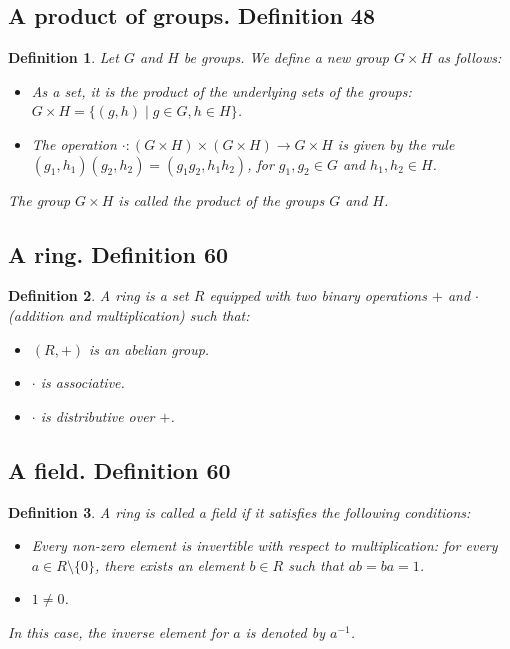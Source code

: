 \documentclass{article}
\newtheorem*{customdefinition}{Definition}
\begin{document}
\subsection*{A product of groups. Definition 48}
\begin{customdefinition}
Let \( G \) and \( H \) be groups. We define a new group \( G \times H \) as follows:
\begin{itemize}
    \item As a set, it is the product of the underlying sets of the groups: \( G \times H = \{ (g, h) \mid g \in G, h \in H \} \).
    \item The operation \( \cdot : (G \times H) \times (G \times H) \rightarrow G \times H \) is given by the rule \((g_1, h_1)(g_2, h_2) = (g_1 g_2, h_1 h_2)\), for \( g_1, g_2 \in G \) and \( h_1, h_2 \in H \).
\end{itemize}
The group \( G \times H \) is called the product of the groups \( G \) and \( H \).
\end{customdefinition}

\subsection*{A ring. Definition 60}
\begin{customdefinition}
A ring is a set \( R \) equipped with two binary operations \( + \) and \( \cdot \) (addition and multiplication) such that:
\begin{itemize}
    \item \( (R, +) \) is an abelian group.
    \item \( \cdot \) is associative.
    \item \( \cdot \) is distributive over \( + \).
\end{itemize}
\end{customdefinition}

\subsection*{A field. Definition 60}
\begin{customdefinition}
A ring is called a field if it satisfies the following conditions:
\begin{itemize}
    \item Every non-zero element is invertible with respect to multiplication: for every \( a \in R \setminus \{0\} \), there exists an element \( b \in R \) such that \( ab = ba = 1 \).
    \item \( 1 \neq 0 \).
\end{itemize}
In this case, the inverse element for \( a \) is denoted by \( a^{-1} \).
\end{customdefinition}
\end{document}
